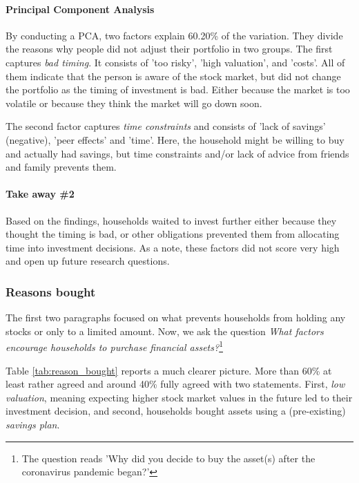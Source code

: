 \documentclass[ProjectABM]{subfiles}
\begin{document}
\paragraph{Principal Component Analysis}
By conducting a PCA, two factors explain 60.20\% of the variation. They divide the reasons why people did not adjust their portfolio in two groups. The first captures \textit{bad timing}. It consists of 'too risky', 'high valuation', and 'costs'. All of them indicate that the person is aware of the stock market, but did not change the portfolio as the timing of investment is bad. Either because the market is too volatile or because they think the market will go down soon.

The second factor captures \textit{time constraints} and consists of 'lack of savings' (negative), 'peer effects' and 'time'. Here, the household might be willing to buy and actually had savings, but time constraints and/or lack of advice from friends and family prevents them.




\paragraph{Take away \#2}
Based on the findings, households waited to invest further either because they thought the timing is bad, or other obligations prevented them from allocating time into investment decisions. As a note, these factors did not score very high and open up future research questions.

\subsubsection{Reasons bought}
The first two paragraphs focused on what prevents households from holding any stocks or only to a limited amount. Now, we ask the question \textit{What factors encourage households to purchase financial assets?}\footnote{The question reads 'Why did you decide to buy the asset(s) after the coronavirus pandemic began?'}



Table \ref{tab:reason_bought} reports a much clearer picture. More than 60\% at least rather agreed and around 40\% fully agreed with two statements. First, \textit{low valuation}, meaning expecting higher stock market values in the future led to their investment decision, and second, households bought assets using a (pre-existing) \textit{savings plan}. %
\end{document}
